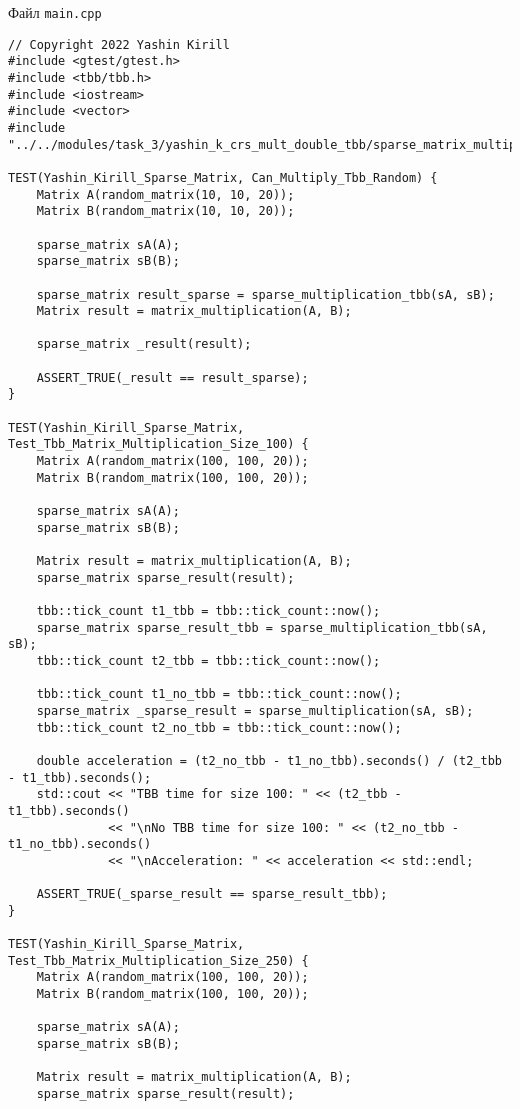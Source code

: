 \documentclass{report}
\begin{document}
Файл \verb|main.cpp|
\begin{lstlisting}
// Copyright 2022 Yashin Kirill
#include <gtest/gtest.h>
#include <tbb/tbb.h>
#include <iostream>
#include <vector>
#include "../../modules/task_3/yashin_k_crs_mult_double_tbb/sparse_matrix_multiplication_tbb.h"

TEST(Yashin_Kirill_Sparse_Matrix, Can_Multiply_Tbb_Random) {
    Matrix A(random_matrix(10, 10, 20));
    Matrix B(random_matrix(10, 10, 20));

    sparse_matrix sA(A);
    sparse_matrix sB(B);

    sparse_matrix result_sparse = sparse_multiplication_tbb(sA, sB);
    Matrix result = matrix_multiplication(A, B);

    sparse_matrix _result(result);

    ASSERT_TRUE(_result == result_sparse);
}

TEST(Yashin_Kirill_Sparse_Matrix, Test_Tbb_Matrix_Multiplication_Size_100) {
    Matrix A(random_matrix(100, 100, 20));
    Matrix B(random_matrix(100, 100, 20));

    sparse_matrix sA(A);
    sparse_matrix sB(B);

    Matrix result = matrix_multiplication(A, B);
    sparse_matrix sparse_result(result);

    tbb::tick_count t1_tbb = tbb::tick_count::now();
    sparse_matrix sparse_result_tbb = sparse_multiplication_tbb(sA, sB);
    tbb::tick_count t2_tbb = tbb::tick_count::now();

    tbb::tick_count t1_no_tbb = tbb::tick_count::now();
    sparse_matrix _sparse_result = sparse_multiplication(sA, sB);
    tbb::tick_count t2_no_tbb = tbb::tick_count::now();

    double acceleration = (t2_no_tbb - t1_no_tbb).seconds() / (t2_tbb - t1_tbb).seconds();
    std::cout << "TBB time for size 100: " << (t2_tbb - t1_tbb).seconds()
              << "\nNo TBB time for size 100: " << (t2_no_tbb - t1_no_tbb).seconds()
              << "\nAcceleration: " << acceleration << std::endl;

    ASSERT_TRUE(_sparse_result == sparse_result_tbb);
}

TEST(Yashin_Kirill_Sparse_Matrix, Test_Tbb_Matrix_Multiplication_Size_250) {
    Matrix A(random_matrix(100, 100, 20));
    Matrix B(random_matrix(100, 100, 20));

    sparse_matrix sA(A);
    sparse_matrix sB(B);

    Matrix result = matrix_multiplication(A, B);
    sparse_matrix sparse_result(result);


\end{lstlisting}
\end{document}
